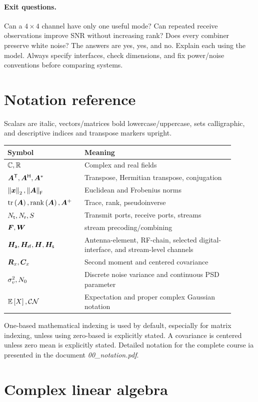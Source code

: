 \paragraph{Exit questions.}
Can a $4\times4$ channel have only one useful mode? Can repeated receive observations improve SNR without increasing rank? Does every combiner preserve white noise? The answers are yes, yes, and no. Explain each using the model. Always specify interfaces, check dimensions, and fix power/noise conventions before comparing systems.

\clearpage\appendix
\section{Notation reference}\label{app:notation}
Scalars are italic, vectors/matrices bold lowercase/uppercase, sets calligraphic, and descriptive indices and transpose markers upright.
\begin{longtable}{p{0.29\linewidth}p{0.61\linewidth}}\toprule
Symbol & Meaning\\\midrule\endhead
$\mathbb{C},\mathbb{R}$ & Complex and real fields\\
${\bm{A}}^{\mathsf{T}},{\bm{A}}^{\mathsf{H}},{\bm{A}}^{*}$ & Transpose, Hermitian transpose, conjugation\\
$\left\|\bm{x}\right\|_2,\left\|\bm{A}\right\|_{\mathsf{F}}$ & Euclidean and Frobenius norms\\
$\operatorname{tr}\left(\bm{A}\right),\operatorname{rank}\left(\bm{A}\right),{\bm{A}}^{+}$ & Trace, rank, pseudoinverse\\
$N_{\mathsf{t}},N_{\mathsf{r}},S$ & Transmit ports, receive ports, streams\\
$\bm{F},\bm{W}$& stream precoding/combining\\
$\bm{H}_{\mathsf{a}},\bm{H}_{\mathsf{rf}},\bm{H},\bm{H}_{\mathsf{s}}$ & Antenna-element, RF-chain, selected digital-interface, and stream-level channels\\
$\bm{R}_x,\bm{C}_x$ & Second moment and centered covariance\\
$\sigma_v^2,N_{0}$ & Discrete noise variance and continuous PSD parameter\\
$\mathbb{E}\left[X\right],\mathcal{CN}$ & Expectation and proper complex Gaussian notation\\\bottomrule
\end{longtable}
One-based mathematical indexing is used by default, especially  for matrix indexing, unless using zero-based is explicitly stated. A covariance is centered unless zero mean is explicitly stated. Detailed notation for the complete course ia presented in the document \textit{00\_notation.pdf}. 

\section{Complex linear algebra}\label{app:algebra}
